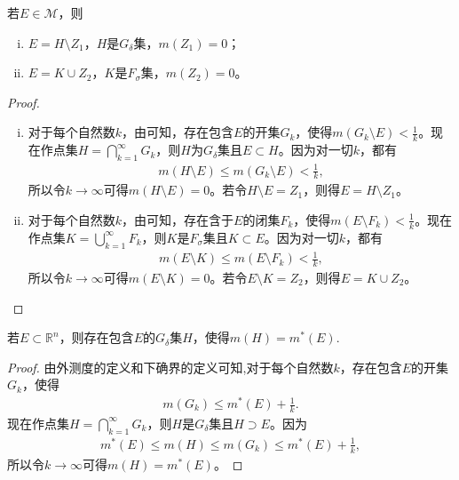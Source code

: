 \documentclass[../../main.tex]{subfiles}
\begin{document}
\begin{theorem}\label{theorem:定理2.14}
若$E\in\mathscr{M}$，则
\begin{enumerate}[(i)]
\item $E = H\setminus Z_1$，$H$是$G_\delta$集，$m(Z_1)=0$；
\item $E = K\cup Z_2$，$K$是$F_\sigma$集，$m(Z_2)=0$。
\end{enumerate}
\end{theorem}
\begin{proof}
\begin{enumerate}[(i)]
\item 对于每个自然数$k$，由可知，存在包含$E$的开集$G_k$，使得$m(G_k\setminus E)<\frac{1}{k}$。现在作点集$H = \bigcap_{k = 1}^{\infty}G_k$，则$H$为$G_\delta$集且$E\subset H$。因为对一切$k$，都有
\begin{align*}
m(H\setminus E)\leqslant m(G_k\setminus E)<\frac{1}{k},
\end{align*}
所以令$k\to \infty$可得$m(H\setminus E)=0$。若令$H\setminus E = Z_1$，则得$E = H\setminus Z_1$。
\item 对于每个自然数$k$，由可知，存在含于$E$的闭集$F_k$，使得$m(E\setminus F_k)<\frac{1}{k}$。现在作点集$K = \bigcup_{k = 1}^{\infty}F_k$，则$K$是$F_\sigma$集且$K\subset E$。因为对一切$k$，都有
\begin{align*}
m(E\setminus K)\leqslant m(E\setminus F_k)<\frac{1}{k},
\end{align*}
所以令$k\to \infty$可得$m(E\setminus K)=0$。若令$E\setminus K = Z_2$，则得$E = K\cup Z_2$。
\end{enumerate}

\end{proof} 

\begin{theorem}[外测度的正则性]\label{theorem:外测度的正则性}
若\(E \subset \mathbb{R}^n\)，则存在包含\(E\)的\(G_\delta\)集\(H\)，使得\(m(H)=m^*(E)\).
\end{theorem}
\begin{proof}
由外测度的定义和下确界的定义可知,对于每个自然数\(k\)，存在包含\(E\)的开集\(G_k\)，使得
\begin{align*}
m(G_k) \leqslant m^*(E) + \frac{1}{k}.
\end{align*}
现在作点集\(H = \bigcap_{k = 1}^{\infty}G_k\)，则\(H\)是\(G_\delta\)集且\(H \supset E\)。因为
\begin{align*}
m^*(E) \leqslant m(H) \leqslant m(G_k) \leqslant m^*(E) + \frac{1}{k},
\end{align*}
所以令$k\to \infty$可得\(m(H)=m^*(E)\)。

\end{proof}
\end{document}
